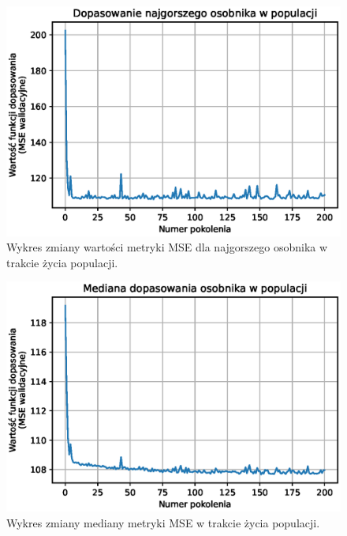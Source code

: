 \documentclass[a4paper,11pt]{article}
\begin{document}
    \begin{figure}[H]
        \label{fig:g_a_worst_fitness}
        \centering
        \includegraphics[width=\textwidth]{g_a_worst_fitness}
        \caption{Wykres zmiany wartości metryki MSE dla najgorszego osobnika w trakcie życia populacji.}
    \end{figure}

    \bigskip

    \begin{figure}[H]
        \label{fig:g_a_mean_fitness}
        \centering
        \includegraphics[width=\textwidth]{g_a_mean_fitness}
        \caption{Wykres zmiany mediany metryki MSE w trakcie życia populacji.}
    \end{figure}

    \bigskip
\end{document}
